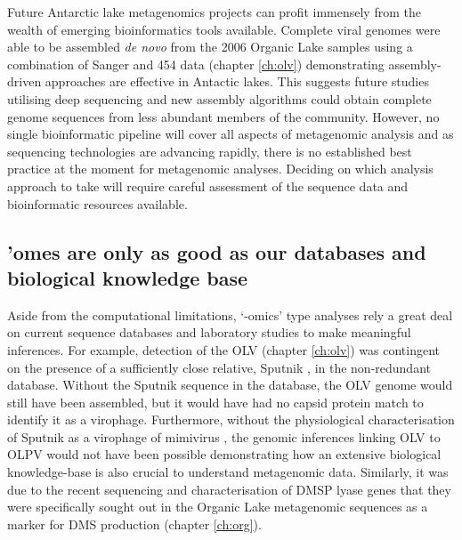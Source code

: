 Future Antarctic lake metagenomics projects can profit immensely from the wealth of emerging bioinformatics tools available.
Complete viral genomes were able to be assembled \emph{de novo} from the 2006 Organic Lake samples using a combination of Sanger and 454 data (chapter \ref{ch:olv}) demonstrating assembly-driven approaches are effective in Antactic lakes.
This suggests future studies utilising deep sequencing and new assembly algorithms could obtain complete genome sequences from less abundant members of the community.
However, no single bioinformatic pipeline will cover all aspects of metagenomic analysis and as sequencing technologies are advancing rapidly, there is no established best practice at the moment for metagenomic analyses.
Deciding on which analysis approach to take will require careful assessment of the sequence data and bioinformatic resources available.

\subsection{ 'omes are only as good as our databases and biological knowledge base}
Aside from the computational limitations, `-omics' type analyses rely a great deal on current sequence databases and laboratory studies to make meaningful inferences.
For example, detection of the \ac{OLV} (chapter \ref{ch:olv}) was contingent on the presence of a sufficiently close relative, Sputnik \cite{LaScola2008}, in the non-redundant database.
Without the Sputnik sequence in the database, the \ac{OLV} genome would still have been assembled, but it would have had no capsid protein match to identify it as a virophage.
Furthermore, without the physiological characterisation of Sputnik as a virophage of mimivirus \cite{LaScola2008}, the genomic inferences linking \ac{OLV} to \ac{OLPV} would not have been possible demonstrating how an extensive biological knowledge-base is also crucial to understand metagenomic data.
Similarly, it was due to the recent sequencing and characterisation of \ac{DMSP} lyase genes \cite{Curson2011b} that they were specifically sought out in the Organic Lake metagenomic sequences as a marker for \ac{DMS} production (chapter \ref{ch:org}).

